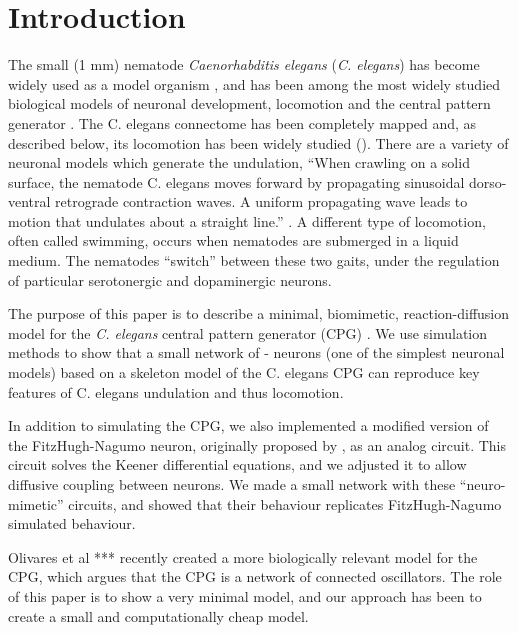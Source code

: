 \documentclass[
    11pt,
]{article}
\begin{document}
\section{Introduction}\label{sec: intro}


The small (1 mm) nematode \emph{Caenorhabditis elegans} (\emph{C. elegans}) has become widely used as a model organism \citep{corsi2015}, and has been among the most widely studied biological models of neuronal development, locomotion and the central pattern generator \citep{katz2016}.
The C. elegans connectome has been completely mapped \citep{jabr} and, as described below, its locomotion has been widely studied (\citet{corsi2015}).  There are a variety of neuronal models which generate the undulation, 
``When crawling on a solid surface, the nematode C. elegans moves forward by propagating sinusoidal dorso-ventral retrograde contraction waves.  A uniform propagating wave leads to motion that undulates about a straight line.'' \citep{kim2011}.
A different type of locomotion, often called swimming, occurs when nematodes are submerged in a liquid medium. The nematodes “switch” between these two gaits, under the regulation of particular serotonergic and dopaminergic neurons.

The purpose of this paper is to describe a minimal, biomimetic, reaction-diffusion model for the \emph{C. elegans} central pattern generator (CPG) \citep{xu2018, wen2012}.  We use simulation methods to show that a small network of \citet{fitzhugh1955}-\citet{nagumo1962} neurons (one of the simplest neuronal models) based on a skeleton model of the C. elegans CPG can reproduce key features of C. elegans undulation \citep{magnes2012} and thus locomotion.

In addition to simulating the CPG, we also implemented a modified version of the FitzHugh-Nagumo neuron, originally proposed by \citet{keener1983}, as an analog circuit.  This circuit solves the Keener differential equations, and we adjusted it to allow diffusive coupling between neurons.  We made a small network with these ``neuro-mimetic'' circuits, and showed that their behaviour replicates FitzHugh-Nagumo simulated behaviour.


Olivares et al *** recently created a more biologically relevant model for the CPG, which argues that the CPG is a network of connected oscillators.  The role of this paper is to show a very minimal model, and our approach has been to create a small and computationally cheap model.
\end{document}
